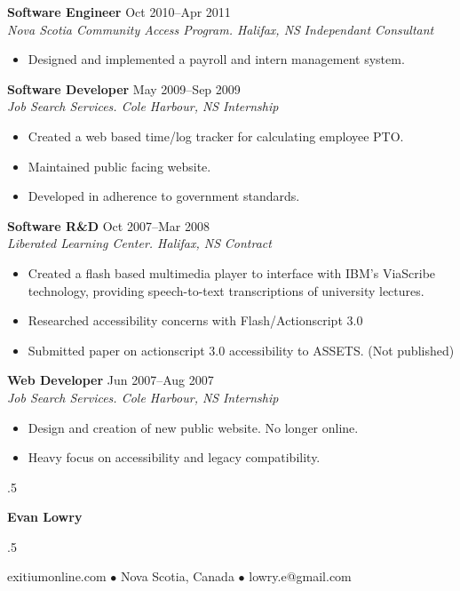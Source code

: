 \documentclass[line,margin]{res}
\begin{document}
\begin{resume}
\textbf{Software Engineer} \hfill Oct 2010--Apr 2011 \\
\textit{Nova Scotia Community Access Program. Halifax, NS} \hfill \textit{Independant Consultant}
\begin{itemize}  \itemsep-2pt
    \item Designed and implemented a payroll and intern management system.
\end{itemize} 

\textbf{Software Developer} \hfill May 2009--Sep 2009 \\
\textit{Job Search Services. Cole Harbour, NS} \hfill \textit{Internship}
\begin{itemize} \itemsep-2pt
    \item Created a web based time/log tracker for calculating employee PTO.
    \item Maintained public facing website.
    \item Developed in adherence to government standards.
\end{itemize}

\textbf{Software R\&D} \hfill Oct 2007--Mar 2008 \\
\textit{Liberated Learning Center. Halifax, NS} \hfill \textit{Contract}
\begin{itemize} \itemsep-2pt
    \item Created a flash based multimedia player to interface with IBM's ViaScribe technology, providing speech-to-text transcriptions of university lectures.
    \item Researched accessibility concerns with Flash/Actionscript 3.0
    \item Submitted paper on actionscript 3.0 accessibility to ASSETS. (Not published)
\end{itemize}

\textbf{Web Developer} \hfill Jun 2007--Aug 2007 \\
\textit{Job Search Services. Cole Harbour, NS} \hfill \textit{Internship}
\begin{itemize} \itemsep-2pt
    \item Design and creation of new public website. No longer online.
    \item Heavy focus on accessibility and legacy compatibility.
\end{itemize}
\end{resume}
\clearpage

\moveleft.5\hoffset\centerline{\LARGE\bf Evan Lowry}
\moveleft.5\hoffset\centerline{exitiumonline.com   {$\bullet$}   Nova Scotia, Canada {$\bullet$}   lowry.e@gmail.com}
\end{document}

